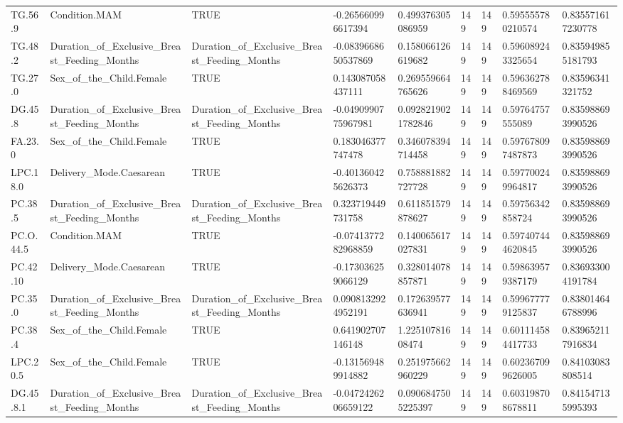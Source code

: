 \begin{longtable}{lllllllll}
TG.56.9 & Condition.MAM & TRUE & -0.265660996617394 & 0.499376305086959 & 149 & 149 & 0.595555780210574 & 0.835571617230778 \\
TG.48.2 & Duration\_of\_Exclusive\_Breast\_Feeding\_Months & Duration\_of\_Exclusive\_Breast\_Feeding\_Months & -0.0839668650537869 & 0.158066126619682 & 149 & 149 & 0.596089243325654 & 0.835949855181793 \\
TG.27.0 & Sex\_of\_the\_Child.Female & TRUE & 0.143087058437111 & 0.269559664765626 & 149 & 149 & 0.596362788469569 & 0.83596341321752 \\
DG.45.8 & Duration\_of\_Exclusive\_Breast\_Feeding\_Months & Duration\_of\_Exclusive\_Breast\_Feeding\_Months & -0.0490990775967981 & 0.0928219021782846 & 149 & 149 & 0.59764757555089 & 0.835988693990526 \\
FA.23.0 & Sex\_of\_the\_Child.Female & TRUE & 0.183046377747478 & 0.346078394714458 & 149 & 149 & 0.597678097487873 & 0.835988693990526 \\
LPC.18.0 & Delivery\_Mode.Caesarean & TRUE & -0.401360425626373 & 0.758881882727728 & 149 & 149 & 0.597700249964817 & 0.835988693990526 \\
PC.38.5 & Duration\_of\_Exclusive\_Breast\_Feeding\_Months & Duration\_of\_Exclusive\_Breast\_Feeding\_Months & 0.323719449731758 & 0.611851579878627 & 149 & 149 & 0.59756342858724 & 0.835988693990526 \\
PC.O.44.5 & Condition.MAM & TRUE & -0.0741377282968859 & 0.140065617027831 & 149 & 149 & 0.597407444620845 & 0.835988693990526 \\
PC.42.10 & Delivery\_Mode.Caesarean & TRUE & -0.173036259066129 & 0.328014078857871 & 149 & 149 & 0.598639579387179 & 0.836933004191784 \\
PC.35.0 & Duration\_of\_Exclusive\_Breast\_Feeding\_Months & Duration\_of\_Exclusive\_Breast\_Feeding\_Months & 0.0908132924952191 & 0.172639577636941 & 149 & 149 & 0.599677779125837 & 0.838014646788996 \\
PC.38.4 & Sex\_of\_the\_Child.Female & TRUE & 0.641902707146148 & 1.22510781608474 & 149 & 149 & 0.601114584417733 & 0.839652117916834 \\
LPC.20.5 & Sex\_of\_the\_Child.Female & TRUE & -0.131569489914882 & 0.251975662960229 & 149 & 149 & 0.602367099626005 & 0.84103083808514 \\
DG.45.8.1 & Duration\_of\_Exclusive\_Breast\_Feeding\_Months & Duration\_of\_Exclusive\_Breast\_Feeding\_Months & -0.0472426206659122 & 0.0906847505225397 & 149 & 149 & 0.603198708678811 & 0.841547135995393 \\

\end{longtable}
